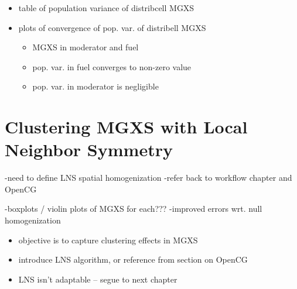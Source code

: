 \begin{itemize}[noitemsep]
  \item table of population variance of distribcell MGXS
  \item plots of convergence of pop. var. of distribell MGXS
  \begin{itemize}[noitemsep]
    \item MGXS in moderator and fuel
    \item pop. var. in fuel converges to non-zero value
    \item pop. var. in moderator is negligible
  \end{itemize}
\end{itemize}


\section{Clustering MGXS with Local Neighbor Symmetry}

-need to define \ac{LNS} spatial homogenization
-refer back to workflow chapter and OpenCG

-boxplots / violin plots of MGXS for each???
-improved errors wrt. null homogenization

\begin{itemize}[noitemsep]
  \item objective is to capture clustering effects in MGXS
  \item introduce LNS algorithm, or reference from section on OpenCG
  \item LNS isn't adaptable -- segue to next chapter
\end{itemize}


